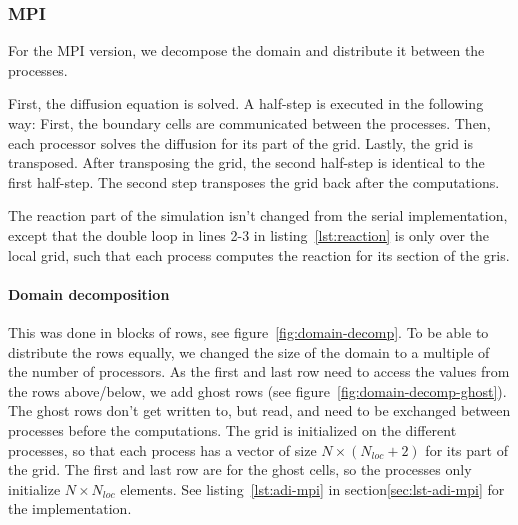 \documentclass[a4paper]{article}
\begin{document}
\subsubsection{MPI}
For the MPI version, we decompose the domain and distribute it between the processes.

First, the diffusion equation is solved.
A half-step is executed in the following way: First, the boundary cells are communicated between the processes.
Then, each processor solves the diffusion for its part of the grid.
Lastly, the grid is transposed.
After transposing the grid, the second half-step is identical to the first half-step.
The second step transposes the grid back after the computations.

The reaction part of the simulation isn't changed from the serial implementation, except that the double loop in lines 2-3 in listing~\ref{lst:reaction} is only over the local grid, such that each process computes the reaction for its section of the gris.

\paragraph{Domain decomposition}\label{sec:domain-decomp}

This was done in blocks of rows, see figure~\ref{fig:domain-decomp}.
To be able to distribute the rows equally, we changed the size of the domain to a multiple of the number of processors.
As the first and last row need to access the values from the rows above/below, we add ghost rows (see figure~\ref{fig:domain-decomp-ghost}).
The ghost rows don't get written to, but read, and need to be exchanged between processes before the computations.
The grid is initialized on the different processes, so that each process has a vector of size $N \times (N_{loc}+2)$ for its part of the grid.
The first and last row are for the ghost cells, so the processes only initialize $N \times N_{loc}$ elements.
See listing~\ref{lst:adi-mpi} in section\ref{sec:lst-adi-mpi} for the implementation.
\end{document}
